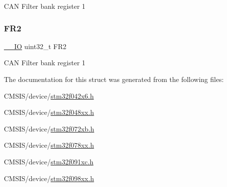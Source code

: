 C\+AN Filter bank register 1 \mbox{\label{struct_c_a_n___filter_register___type_def_a7f7d80b45b7574463d7030fc8a464582}} 
\subsubsection{\texorpdfstring{F\+R2}{FR2}}
{\footnotesize\ttfamily \hyperlink{core__sc300_8h_aec43007d9998a0a0e01faede4133d6be}{\+\_\+\+\_\+\+IO} uint32\+\_\+t F\+R2}

C\+AN Filter bank register 1 

The documentation for this struct was generated from the following files\+:\begin{DoxyCompactItemize}
\item 
C\+M\+S\+I\+S/device/\hyperlink{stm32f042x6_8h}{stm32f042x6.\+h}\item 
C\+M\+S\+I\+S/device/\hyperlink{stm32f048xx_8h}{stm32f048xx.\+h}\item 
C\+M\+S\+I\+S/device/\hyperlink{stm32f072xb_8h}{stm32f072xb.\+h}\item 
C\+M\+S\+I\+S/device/\hyperlink{stm32f078xx_8h}{stm32f078xx.\+h}\item 
C\+M\+S\+I\+S/device/\hyperlink{stm32f091xc_8h}{stm32f091xc.\+h}\item 
C\+M\+S\+I\+S/device/\hyperlink{stm32f098xx_8h}{stm32f098xx.\+h}\end{DoxyCompactItemize}
